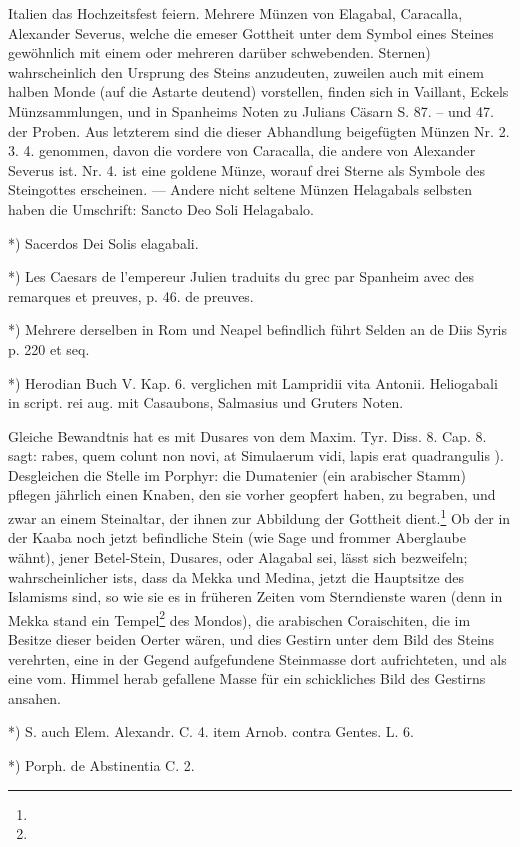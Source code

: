 \documentclass[a4paper, 11pt, oneside, polutonikogreek, german]{article}
\begin{document}
Italien das Hochzeitsfest feiern. Mehrere Münzen von Elagabal, Caracalla, Alexander Severus, welche die emeser Gottheit unter dem Symbol eines Steines gewöhnlich mit einem oder mehreren darüber schwebenden. Sternen) wahrscheinlich den Ursprung des Steins anzudeuten, zuweilen auch mit einem halben Monde (auf die Astarte deutend) vorstellen, finden sich in Vaillant, Eckels Münzsammlungen, und in Spanheims Noten zu Julians Cäsarn S. 87. -- und 47. der Proben. Aus letzterem sind die dieser Abhandlung beigefügten Münzen Nr. 2. 3. 4. genommen, davon die vordere von Caracalla, die andere von Alexander Severus ist. Nr. 4. ist eine goldene Münze, worauf drei Sterne als Symbole des Steingottes erscheinen. --- Andere nicht seltene Münzen Helagabals selbsten haben die Umschrift: Sancto Deo Soli Helagabalo.

*) Sacerdos Dei Solis elagabali.

*) Les Caesars de l'empereur Julien traduits du grec par Spanheim avec des remarques et preuves, p. 46. de preuves.

*) Mehrere derselben in Rom und Neapel befindlich führt Selden an de Diis Syris p. 220 et seq.

*) Herodian Buch V. Kap. 6. verglichen mit Lampridii vita Antonii. Heliogabali in script. rei aug. mit Casaubons, Salmasius und Gruters Noten.

Gleiche Bewandtnis hat es mit Dusares von dem Maxim. Tyr. Diss. 8. Cap. 8. sagt: rabes, quem colunt non novi, at Simulaerum vidi, lapis erat quadrangulis ). Desgleichen die Stelle im Porphyr: die Dumatenier (ein arabischer Stamm) pflegen jährlich einen Knaben, den sie vorher geopfert haben, zu begraben, und zwar an einem Steinaltar, der ihnen zur Abbildung der Gottheit dient.\footnote{} Ob der in der Kaaba noch jetzt befindliche Stein (wie Sage und frommer Aberglaube wähnt), jener Betel-Stein, Dusares, oder Alagabal sei, lässt sich bezweifeln; wahrscheinlicher ists, dass da Mekka und Medina, jetzt die Hauptsitze des Islamisms sind, so wie sie es in früheren Zeiten vom Sterndienste waren (denn in Mekka stand ein Tempel\footnote{} des Mondos), die arabischen Coraischiten, die im Besitze dieser beiden Oerter wären, und dies Gestirn unter dem Bild des Steins verehrten, eine in der Gegend aufgefundene Steinmasse dort aufrichteten, und als eine vom. Himmel herab gefallene Masse für ein schickliches Bild des Gestirns ansahen.

*) S. auch Elem. Alexandr. C. 4. item Arnob. contra Gentes. L. 6.

*) Porph. de Abstinentia C. 2.
\end{document}
